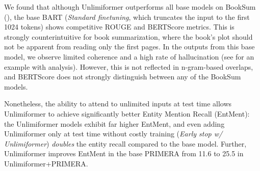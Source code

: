 \documentclass{article}
\newcommand{\ours}{Unlimiformer\xspace}
\begin{document}
We found that although \ours outperforms all base models on BookSum (), the base BART (\emph{Standard finetuning}, which truncates the input to the first 1024 tokens) shows competitive ROUGE and BERTScore metrics.
This is strongly counterintuitive for book summarization, where the book's plot should not be apparent from reading only the first pages.
In the outputs from this base model, we observe limited coherence and a high rate of hallucination (see  for an example with analysis). However, this is not reflected in n-gram-based overlaps, and BERTScore does not strongly distinguish between any of the BookSum models.

Nonetheless, the ability to attend to unlimited inputs at test time allows \ours to achieve significantly better Entity Mention Recall (EntMent): 
the \ours models exhibit far higher EntMent, and even adding \ours only at test time without costly training ({\textit{Early stop w/ \ours}}) \emph{doubles} the entity recall compared to the base model. Further, \ours improves EntMent in the base PRIMERA from 11.6 to 25.5 in Unlimiformer+PRIMERA.
\end{document}
